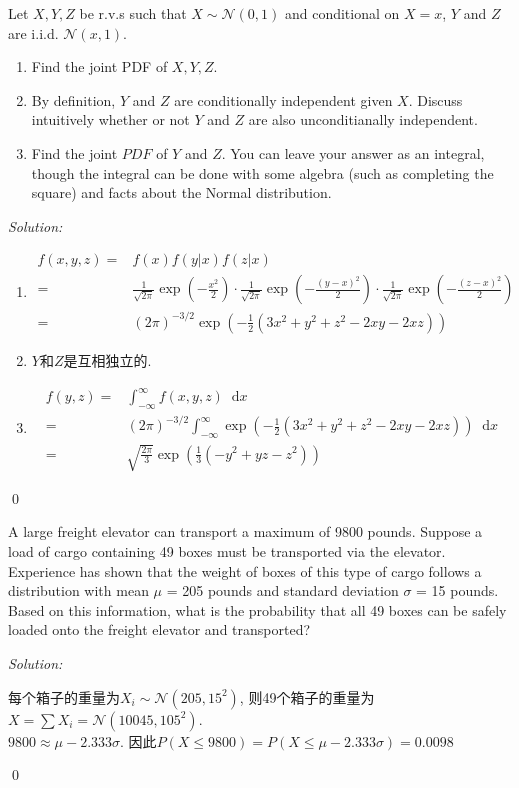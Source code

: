 \documentclass[12pt]{article}
\newenvironment{problem}[2][Problem]{\begin{trivlist}
\item[\hskip \labelsep {\bfseries #1}\hskip \labelsep {\bfseries #2.}]}{\end{trivlist}}
\newenvironment{sol}
    {\emph{Solution:}
    }
    {
    \qed
    }
\newcommand{\intii}{\int_{-\infty}^\infty}                                  %
\newcommand\of[1]{\left( #1 \right)}                                  %
\renewcommand\d{\mathop{}\!\mathrm{d}}                                            %
\newcommand{\f}[2]{\frac{#1}{#2}}                                      %
\newcommand{\ff}[1]{\frac{1}{#1}}                                      %
\newcommand\sg{\sigma}                                                 %
\newcommand{\x}{=&\!\!\!\!\!}                                                    %
\newcommand{\ar}[2][rl]{\begin{array}{#1}                              %
            #2
        \end{array}}
\begin{document}
\begin{problem}{3}
Let $X,Y,Z$ be r.v.s such that $X\sim \mathcal{N}(0,1)$ and conditional on $X=x$, $Y$ and $Z$ are i.i.d. $\mathcal{N}(x,1)$.
\begin{enumerate}
    \item Find the joint PDF of $X,Y,Z$.
    \item By definition, $Y$ and $Z$ are conditionally independent given $X$. Discuss intuitively whether or not $Y$ and $Z$ are also unconditianally independent.
    \item Find the joint $PDF$ of $Y$ and $Z$. You can leave your answer as an integral, though the integral can be done with some algebra (such as completing the square) and facts about the Normal distribution.
\end{enumerate}
\end{problem}
\begin{sol}
    \begin{enumerate}
        \item $$\ar{f(x,y,z) \x f(x)f(y|x)f(z|x)\\ \x  \ff{\sqrt{2\pi}}\exp\of{-\f{x^2}{2}} \cdot \ff{\sqrt{2\pi}}\exp\of{-\f{(y-x)^2}{2}} \cdot \ff{\sqrt{2\pi}}\exp\of{-\f{(z-x)^2}{2}}\\
        \x (2\pi)^{-3/2}\exp\of{-\ff{2}(3x^2+y^2+z^2-2xy-2xz)}
        }$$
        \item $Y$和$Z$是互相独立的. 
        \item $$\ar{f(y,z) \x \intii f(x,y,z)\d x\\ 
        \x (2\pi)^{-3/2}  \intii \exp\of{-\ff{2}(3x^2+y^2+z^2-2xy-2xz)}\d x\\
        \x \sqrt{\f{2 \pi }{3}} \exp\of{\frac{1}{3} \left(-y^2+y z-z^2\right)}
        }$$
    \end{enumerate}
\end{sol}




\begin{problem}{4}
A large freight elevator can transport a maximum of 9800 pounds. Suppose a load of cargo containing 49 boxes must be
transported via the elevator. Experience has shown that the weight of boxes of this type of cargo follows a distribution with
mean $\mu$  = 205 pounds and standard deviation $\sigma$  = 15 pounds. Based on this information, what is the probability that all 49
boxes can be safely loaded onto the freight elevator and transported?
\end{problem}
\begin{sol}
每个箱子的重量为$X_i\sim \mathcal{N}(205,15^2)$, 则49个箱子的重量为$X = \sum X_i =\mathcal{N}(10045,105^2)$.\\
$9800\approx\mu-2.333\sg$. 因此$P(X\leq 9800)=P(X\leq\mu-2.333\sg)=0.0098$
\end{sol}
\end{document}
